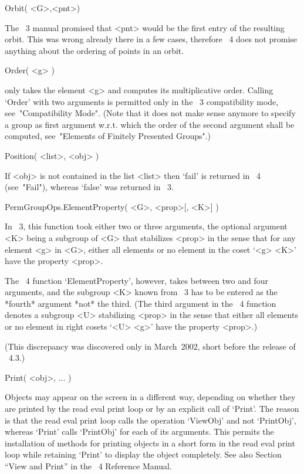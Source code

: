 \>Orbit( <G>,<pnt>)

The {\GAP}~3 manual promised that <pnt> would be the first entry of the
resulting orbit. This was wrong already there in a few cases, therefore
{\GAP}~4 does not promise anything about the ordering of points in an orbit.

\>Order( <g> )

only takes the element <g> and computes its multiplicative order.
Calling `Order' with two arguments is permitted only in the
{\GAP}~3 compatibility mode, see~"Compatibility Mode".
(Note that it does not make sense anymore to specify a group as
first argument w.r.t. which the order of the second argument shall
be computed, see~"Elements of Finitely Presented Groups".)

\>Position( <list>, <obj> )

If <obj> is not contained in the list <list> then `fail' is returned
in {\GAP}~4 (see~"Fail"), whereas `false' was returned in {\GAP}~3.


\>PermGroupOps.ElementProperty( <G>, <prop>[, <K>] )

In {\GAP}~3, this function took either two or three arguments,
the optional argument <K> being a subgroup of <G> that stabilizes <prop>
in the sense that for any element <g> in <G>,
either all elements or no element in the coset `<g> \* <K>' have the
property <prop>.

The {\GAP}~4 function `ElementProperty', however,
takes between two and four arguments,
and the subgroup <K> known from {\GAP}~3 has to be entered as the *fourth*
argument *not* the third.
(The third argument in the {\GAP}~4 function denotes a subgroup <U>
stabilizing <prop> in the sense that either all elements or no element
in right cosets `<U> \* <g>' have the property <prop>.)

(This discrepancy was discovered only in March~2002,
short before the release of {\GAP}~4.3.)


\>Print( <obj>, ... )

Objects may appear on the screen in a different way,
depending on whether they are printed by the read eval print loop
or by an explicit call of `Print'.
The reason is that the read eval print loop calls the operation `ViewObj'
and not `PrintObj', whereas `Print' calls `PrintObj' for each of its
arguments.
This permits the installation of methods for printing objects in a short form
in the read eval print loop while retaining `Print' to display
the object completely.
See also Section ``View and Print'' in the {\GAP}~4 Reference Manual.

